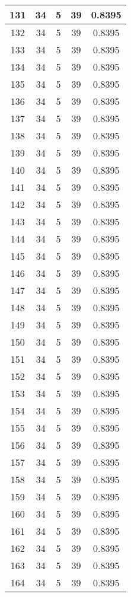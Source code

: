 \documentclass[letterpaper, 12pt]{article}
\begin{document}
\begin{longtable}{|c|c|c|c|c|}
\hline
131 & 34 & 5 & 39 & 0.8395 \\
\hline
132 & 34 & 5 & 39 & 0.8395 \\
\hline
133 & 34 & 5 & 39 & 0.8395 \\
\hline
134 & 34 & 5 & 39 & 0.8395 \\
\hline
135 & 34 & 5 & 39 & 0.8395 \\
\hline
136 & 34 & 5 & 39 & 0.8395 \\
\hline
137 & 34 & 5 & 39 & 0.8395 \\
\hline
138 & 34 & 5 & 39 & 0.8395 \\
\hline
139 & 34 & 5 & 39 & 0.8395 \\
\hline
140 & 34 & 5 & 39 & 0.8395 \\
\hline
141 & 34 & 5 & 39 & 0.8395 \\
\hline
142 & 34 & 5 & 39 & 0.8395 \\
\hline
143 & 34 & 5 & 39 & 0.8395 \\
\hline
144 & 34 & 5 & 39 & 0.8395 \\
\hline
145 & 34 & 5 & 39 & 0.8395 \\
\hline
146 & 34 & 5 & 39 & 0.8395 \\
\hline
147 & 34 & 5 & 39 & 0.8395 \\
\hline
148 & 34 & 5 & 39 & 0.8395 \\
\hline
149 & 34 & 5 & 39 & 0.8395 \\
\hline
150 & 34 & 5 & 39 & 0.8395 \\
\hline
151 & 34 & 5 & 39 & 0.8395 \\
\hline
152 & 34 & 5 & 39 & 0.8395 \\
\hline
153 & 34 & 5 & 39 & 0.8395 \\
\hline
154 & 34 & 5 & 39 & 0.8395 \\
\hline
155 & 34 & 5 & 39 & 0.8395 \\
\hline
156 & 34 & 5 & 39 & 0.8395 \\
\hline
157 & 34 & 5 & 39 & 0.8395 \\
\hline
158 & 34 & 5 & 39 & 0.8395 \\
\hline
159 & 34 & 5 & 39 & 0.8395 \\
\hline
160 & 34 & 5 & 39 & 0.8395 \\
\hline
161 & 34 & 5 & 39 & 0.8395 \\
\hline
162 & 34 & 5 & 39 & 0.8395 \\
\hline
163 & 34 & 5 & 39 & 0.8395 \\
\hline
164 & 34 & 5 & 39 & 0.8395 \\

\end{longtable}
\end{document}
